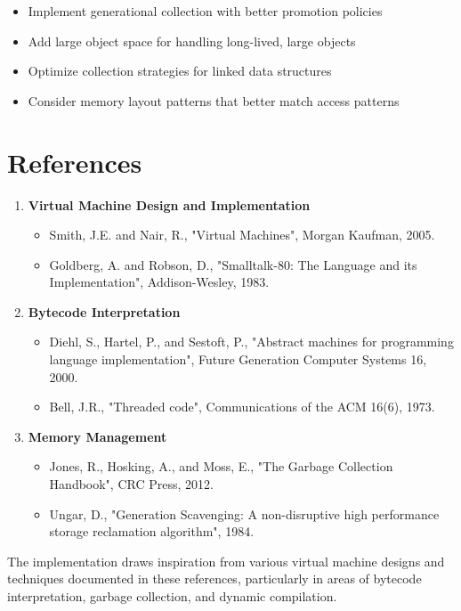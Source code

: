 \documentclass[12pt, a4paper]{article}
\begin{document}
\begin{itemize}
\item Implement generational collection with better promotion policies
\item Add large object space for handling long-lived, large objects
\item Optimize collection strategies for linked data structures
\item Consider memory layout patterns that better match access patterns
\end{itemize}

\section*{References}
\begin{enumerate}
\item \textbf{Virtual Machine Design and Implementation}
    \begin{itemize}
    \item Smith, J.E. and Nair, R., "Virtual Machines", Morgan Kaufman, 2005.
    \item Goldberg, A. and Robson, D., "Smalltalk-80: The Language and its Implementation", Addison-Wesley, 1983.
    \end{itemize}

\item \textbf{Bytecode Interpretation}
    \begin{itemize}
    \item Diehl, S., Hartel, P., and Sestoft, P., "Abstract machines for programming language implementation", Future Generation Computer Systems 16, 2000.
    \item Bell, J.R., "Threaded code", Communications of the ACM 16(6), 1973.
    \end{itemize}

\item \textbf{Memory Management}
    \begin{itemize}
    \item Jones, R., Hosking, A., and Moss, E., "The Garbage Collection Handbook", CRC Press, 2012.
    \item Ungar, D., "Generation Scavenging: A non-disruptive high performance storage reclamation algorithm", 1984.
    \end{itemize}

\end{enumerate}

The implementation draws inspiration from various virtual machine designs and techniques documented in these references, particularly in areas of bytecode interpretation, garbage collection, and dynamic compilation.
\end{document}

